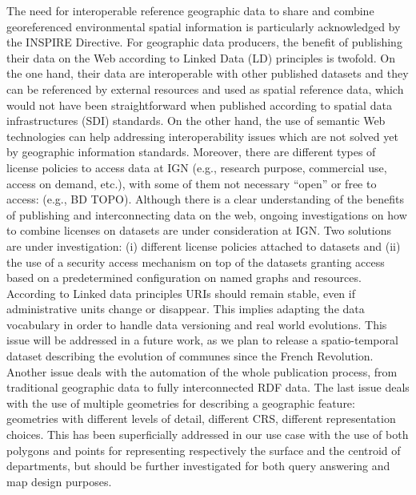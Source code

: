  The need for interoperable reference geographic data to share and combine georeferenced environmental spatial information is particularly acknowledged by the INSPIRE Directive. For geographic data producers, the benefit of publishing their data on the Web according to Linked Data  (LD) principles is twofold. On the one hand, their data are interoperable with other published datasets and they can be referenced by external resources and used as spatial reference data, which would not have been straightforward when published according to spatial data infrastructures (SDI) standards. On the other hand, the use of semantic Web technologies can help addressing interoperability issues which are not solved yet by geographic information standards. 
Moreover, there are different types of license policies to access data at IGN (e.g., research purpose, commercial use, access on demand, etc.), with some of them not necessary ``open'' or free to access: (e.g., BD TOPO\circledR). Although there is a clear understanding of the benefits of publishing and interconnecting data on the web, ongoing investigations on how to combine licenses on datasets are under consideration at IGN. Two solutions are under investigation: (i) different license policies attached to datasets and (ii) the use of a security access mechanism on top of the datasets granting access based on a predetermined configuration on named graphs and resources. 
According to Linked data principles URIs should remain stable, even if administrative units change or disappear. This implies adapting the data vocabulary in order to handle data versioning and real world evolutions. This issue will be addressed in a future work, as we plan to release a spatio-temporal dataset describing the evolution of communes since the French Revolution. Another issue deals with the automation of the whole publication process, from traditional geographic data to fully interconnected RDF data.
The last issue deals with the use of multiple geometries for describing a geographic feature: geometries with different levels of detail, different CRS, different representation choices. This has been superficially addressed in our use case with the use of both polygons and points for representing respectively the surface and the centroid of departments, but should be further investigated for both query answering and map design purposes.


